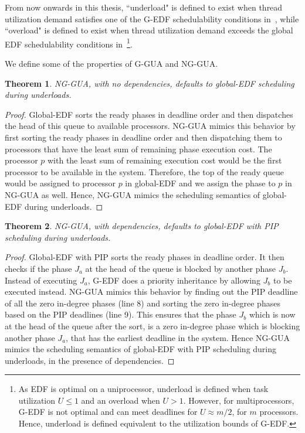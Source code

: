 \documentclass[12pt,dvips]{report}
\renewcommand{\baselinestretch}{1}
\newtheorem{thm}{Theorem}
\begin{document}
From now onwards in this thesis, ``underload" is defined to exist when thread utilization demand satisfies one of the G-EDF schedulability conditions in~\cite{GEDF}, while ``overload" is defined to exist when thread utilization demand exceeds the global EDF schedulability conditions in~\cite{GEDF}\footnote{As EDF is optimal on a uniprocessor, underload is defined when task utilization $U \le 1$ and an overload when $U > 1$. However, for multiprocessors, G-EDF is not optimal and can meet deadlines for $U \approx m/2$, for $m$ processors. Hence, underload is defined equivalent to the utilization bounds of G-EDF.}.


We define some of the properties of G-GUA and NG-GUA.

\renewcommand{\baselinestretch}{1.0}
\begin{thm} 
NG-GUA, with no dependencies, defaults to global-EDF scheduling during underloads. 
\end{thm}

\begin{proof}
Global-EDF sorts the ready phases in deadline order and then dispatches the head of this queue to available processors. NG-GUA mimics this behavior by first sorting the ready phases in deadline order and then dispatching them to processors that have the least sum of remaining phase execution cost. The processor $p$ with the least sum of remaining execution cost would be the first processor to be available in the system. Therefore, the top of the ready queue would be assigned to processor $p$ in global-EDF and we assign the phase to $p$ in NG-GUA as well. Hence, NG-GUA mimics the scheduling semantics of global-EDF during underloads.
\end{proof}

\begin{thm} 
NG-GUA, with dependencies, defaults to global-EDF with PIP scheduling during underloads. 
\end{thm}

\begin{proof}
Global-EDF with PIP sorts the ready phases in deadline order. It then checks if the phase $J_a$ at the head of the queue is blocked by another phase $J_b$. Instead of executing $J_a$, G-EDF does a priority inheritance by allowing $J_b$ to be executed instead. NG-GUA mimics this behavior by finding out the PIP deadline of all the zero in-degree phases (line 8) and sorting the zero in-degree phases based on the PIP deadlines (line 9). This ensures that the phase $J_b$ which is now at the head of the queue after the sort, is a zero in-degree phase which is blocking another phase $J_a$, that has the earliest deadline in the system. Hence NG-GUA mimics the scheduling semantics of global-EDF with PIP scheduling during underloads, in the presence of dependencies.
\end{proof}
\end{document}
